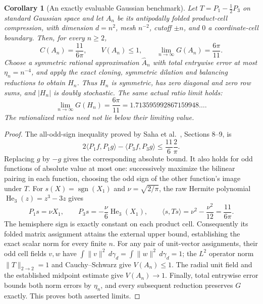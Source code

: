 \documentclass[11pt]{article}
\newtheorem{corollary}[theorem]{Corollary}
\begin{document}
\begin{corollary}[An exactly evaluable Gaussian benchmark]
\label{cor:half-benchmark}
Let $T=P_1-\frac12P_3$ on standard Gaussian space and let $A_n$
be its antipodally folded product-cell compression, with dimension
$d=n^2$, mesh $n^{-2}$, cutoff $\pm n$, and $0$ a coordinate-cell
boundary.  Then, for every $n\geq2$,
\[
 C(A_n)=\frac{11}{6\pi},\qquad V(A_n)\leq1,
 \qquad \lim_{n\to\infty}G(A_n)=\frac{6\pi}{11}.
\]
Choose a symmetric rational approximation $\widehat A_n$ with total
entrywise error at most $\eta_n=n^{-4}$, and apply the exact cloning,
symmetric dilation and balancing reductions to obtain $H_n$.
Thus $H_n$ is symmetric, has zero diagonal and zero row sums, and
$|H_n|$ is doubly stochastic.  The same actual ratio limit holds:
\[
 \lim_{n\to\infty}G(H_n)=\frac{6\pi}{11}
 =1.713595992867159948\ldots.
\]
The rationalized ratios need not lie below their limiting value.
\end{corollary}
\begin{proof}
The all-odd-sign inequality proved by Saha et al.~\cite{saha},
Sections 8--9, is
\[
 2\langle P_1f,P_1g\rangle-\langle P_3f,P_3g\rangle
 \leq\frac{11}{6}\frac2\pi.
\]
Replacing $g$ by $-g$ gives the corresponding absolute bound.
It also holds for odd functions of absolute value at most one:
successively maximize the bilinear pairing in each function, choosing
the odd sign of the other function's image under $T$.
For $s(X)=\operatorname{sgn}(X_1)$ and
$\nu=\sqrt{2/\pi}$, the raw Hermite polynomial
$\operatorname{He}_3(z)=z^3-3z$ gives
\[
 P_1s=\nu X_1,\qquad P_3s=-\frac\nu6
 \operatorname{He}_3(X_1),\qquad
 \langle s,Ts\rangle=\nu^2-\frac{\nu^2}{12}
 =\frac{11}{6\pi}.
\]
The hemisphere sign is exactly constant on each product cell.
Consequently its folded matrix assignment attains the external upper
bound, establishing the exact scalar norm for every finite $n$.
For any pair of unit-vector assignments, their odd cell fields $v,w$
have $\int\|v\|^2\,d\gamma_d=\int\|w\|^2\,d\gamma_d=1$;
the $L^2$ operator norm $\|T\|_{2\to2}=1$ and Cauchy--Schwarz give
$V(A_n)\leq1$.
The radial unit field and the established midpoint estimate give
$V(A_n)\to1$.
Finally, total entrywise error bounds both norm errors by $\eta_n$,
and every subsequent reduction preserves $G$ exactly.  This proves
both asserted limits.
\end{proof}
\end{document}
